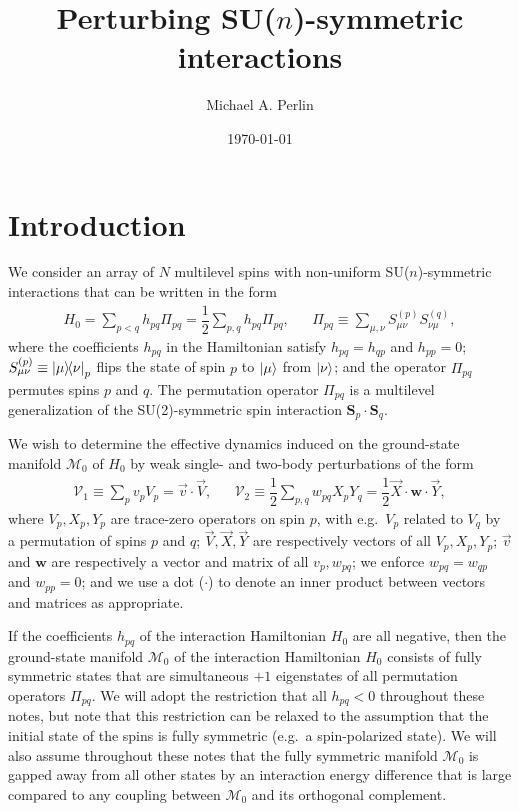 \documentclass[nofootinbib,notitlepage,11pt]{revtex4-2}
\newcommand{\f}[2]{\dfrac{#1}{#2}} %
\renewcommand{\c}{\cdot} %
\newcommand{\m}{\bm} %
\renewcommand{\v}{\vec} %
\newcommand{\1}{\mathds{1}}
\newcommand{\M}{\mathcal{M}}
\newcommand{\V}{\mathcal{V}}
\begin{document}
\title{Perturbing SU($n$)-symmetric interactions}%
\author{Michael A. Perlin}%
\date{\today}

\maketitle

\tableofcontents

\section{Introduction}

We consider an array of $N$ multilevel spins with non-uniform
SU($n$)-symmetric interactions that can be written in the form
\begin{align}
  H_0 = \sum_{p<q} h_{pq} \Pi_{pq}
  = \f12 \sum_{p,q} h_{pq} \Pi_{pq},
  &&
  \Pi_{pq} \equiv \sum_{\mu,\nu} S_{\mu\nu}^{(p)} S_{\nu\mu}^{(q)},
  \label{eq:ints}
\end{align}
where the coefficients $h_{pq}$ in the Hamiltonian satisfy
$h_{pq}=h_{qp}$ and $h_{pp}=0$;
$S_{\mu\nu}^{(p)}\equiv\op{\mu}{\nu}_p$ flips the state of spin $p$ to
$\ket\mu$ from $\ket\nu$; and the operator $\Pi_{pq}$ permutes spins
$p$ and $q$.  The permutation operator $\Pi_{pq}$ is a multilevel
generalization of the SU(2)-symmetric spin interaction
$\m S_p\c\m S_q$.

We wish to determine the effective dynamics induced on the
ground-state manifold $\M_0$ of $H_0$ by weak single- and two-body
perturbations of the form
\begin{align}
  \V_1 \equiv \sum_p v_p V_p = \v v\c\v V,
  &&
  \V_2 \equiv \f12 \sum_{p,q} w_{pq} X_p Y_q
  = \f12 \v X \c\m w \c\v Y,
  \label{eq:perturbations}
\end{align}
where $V_p,X_p,Y_p$ are trace-zero operators on spin $p$, with
e.g.~$V_p$ related to $V_q$ by a permutation of spins $p$ and $q$;
$\v V,\v X,\v Y$ are respectively vectors of all $V_p,X_p,Y_p$; $\v v$
and $\m w$ are respectively a vector and matrix of all $v_p,w_{pq}$;
we enforce $w_{pq}=w_{qp}$ and $w_{pp}=0$; and we use a dot ($\c$) to
denote an inner product between vectors and matrices as appropriate.

If the coefficients $h_{pq}$ of the interaction Hamiltonian $H_0$ are
all negative, then the ground-state manifold $\M_0$ of the interaction
Hamiltonian $H_0$ consists of fully symmetric states that are
simultaneous $+1$ eigenstates of all permutation operators $\Pi_{pq}$.
We will adopt the restriction that all $h_{pq}<0$ throughout these
notes, but note that this restriction can be relaxed to the assumption
that the initial state of the spins is fully symmetric (e.g.~a
spin-polarized state).  We will also assume throughout these notes
that the fully symmetric manifold $\M_0$ is gapped away from all other
states by an interaction energy difference that is large compared to
any coupling between $\M_0$ and its orthogonal complement.
\end{document}
